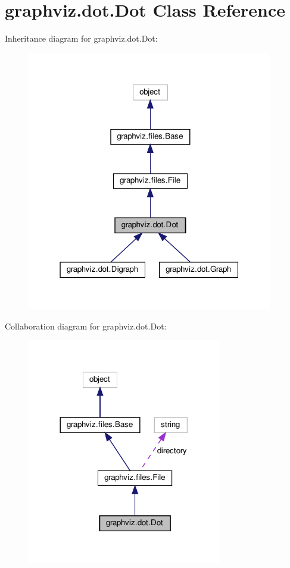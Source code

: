 \hypertarget{classgraphviz_1_1dot_1_1Dot}{}\section{graphviz.\+dot.\+Dot Class Reference}
\label{classgraphviz_1_1dot_1_1Dot}


Inheritance diagram for graphviz.\+dot.\+Dot\+:
\nopagebreak
\begin{figure}[H]
\begin{center}
\leavevmode
\includegraphics[width=304pt]{classgraphviz_1_1dot_1_1Dot__inherit__graph}
\end{center}
\end{figure}


Collaboration diagram for graphviz.\+dot.\+Dot\+:
\nopagebreak
\begin{figure}[H]
\begin{center}
\leavevmode
\includegraphics[width=240pt]{classgraphviz_1_1dot_1_1Dot__coll__graph}
\end{center}
\end{figure}
